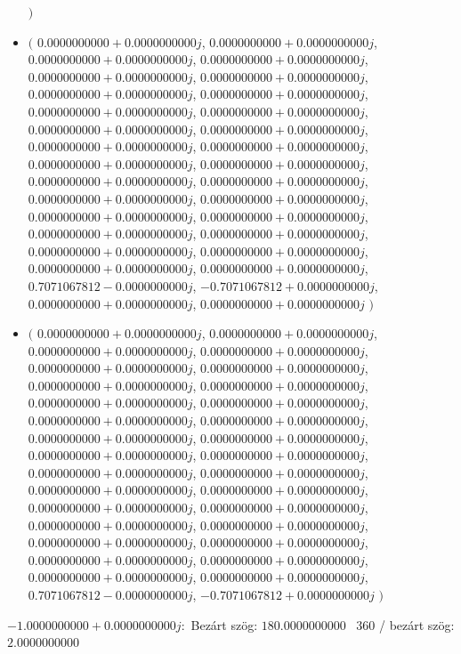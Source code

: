\documentclass[14pt,a4paper]{article}
\begin{document}
\begin{itemize}
$\big)$
\item
$\big($
$0.0000000000+0.0000000000j$, $0.0000000000+0.0000000000j$, $0.0000000000+0.0000000000j$, $0.0000000000+0.0000000000j$, $0.0000000000+0.0000000000j$, $0.0000000000+0.0000000000j$, $0.0000000000+0.0000000000j$, $0.0000000000+0.0000000000j$, $0.0000000000+0.0000000000j$, $0.0000000000+0.0000000000j$, $0.0000000000+0.0000000000j$, $0.0000000000+0.0000000000j$, $0.0000000000+0.0000000000j$, $0.0000000000+0.0000000000j$, $0.0000000000+0.0000000000j$, $0.0000000000+0.0000000000j$, $0.0000000000+0.0000000000j$, $0.0000000000+0.0000000000j$, $0.0000000000+0.0000000000j$, $0.0000000000+0.0000000000j$, $0.0000000000+0.0000000000j$, $0.0000000000+0.0000000000j$, $0.0000000000+0.0000000000j$, $0.0000000000+0.0000000000j$, $0.0000000000+0.0000000000j$, $0.0000000000+0.0000000000j$, $0.0000000000+0.0000000000j$, $0.0000000000+0.0000000000j$, $0.7071067812-0.0000000000j$, $-0.7071067812+0.0000000000j$, $0.0000000000+0.0000000000j$, $0.0000000000+0.0000000000j$
$\big)$
\item
$\big($
$0.0000000000+0.0000000000j$, $0.0000000000+0.0000000000j$, $0.0000000000+0.0000000000j$, $0.0000000000+0.0000000000j$, $0.0000000000+0.0000000000j$, $0.0000000000+0.0000000000j$, $0.0000000000+0.0000000000j$, $0.0000000000+0.0000000000j$, $0.0000000000+0.0000000000j$, $0.0000000000+0.0000000000j$, $0.0000000000+0.0000000000j$, $0.0000000000+0.0000000000j$, $0.0000000000+0.0000000000j$, $0.0000000000+0.0000000000j$, $0.0000000000+0.0000000000j$, $0.0000000000+0.0000000000j$, $0.0000000000+0.0000000000j$, $0.0000000000+0.0000000000j$, $0.0000000000+0.0000000000j$, $0.0000000000+0.0000000000j$, $0.0000000000+0.0000000000j$, $0.0000000000+0.0000000000j$, $0.0000000000+0.0000000000j$, $0.0000000000+0.0000000000j$, $0.0000000000+0.0000000000j$, $0.0000000000+0.0000000000j$, $0.0000000000+0.0000000000j$, $0.0000000000+0.0000000000j$, $0.0000000000+0.0000000000j$, $0.0000000000+0.0000000000j$, $0.7071067812-0.0000000000j$, $-0.7071067812+0.0000000000j$
$\big)$
\end{itemize}
$-1.0000000000+0.0000000000j$:\
Bezárt szög: $180.0000000000$ \
360 / bezárt szög: $2.0000000000$\
\end{document}
